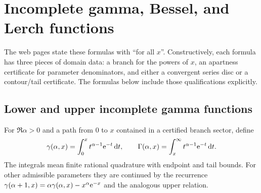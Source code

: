 \section{Incomplete gamma, Bessel, and Lerch functions}\label{sec:higher-cases}

The web pages state these formulas with ``for all $x$''.  Constructively, each
formula has three pieces of domain data: a branch for the powers of $x$, an
apartness certificate for parameter denominators, and either a convergent
series disc or a contour/tail certificate.  The formulas below include those
qualifications explicitly.

\subsection{Lower and upper incomplete gamma functions}

For $\Re\alpha>0$ and a path from $0$ to $x$ contained in a certified branch
sector, define
\[
 \gamma(\alpha,x)=\int_0^x t^{\alpha-1}\mathrm e^{-t}\,\mathrm d t,
 \qquad
 \Gamma(\alpha,x)=\int_x^\infty t^{\alpha-1}\mathrm e^{-t}\,\mathrm d t.
\]
The integrals mean finite rational quadrature with endpoint and tail bounds.
For other admissible parameters they are continued by the recurrence
$\gamma(\alpha+1,x)=\alpha\gamma(\alpha,x)-x^\alpha\mathrm e^{-x}$ and the analogous
upper relation.

